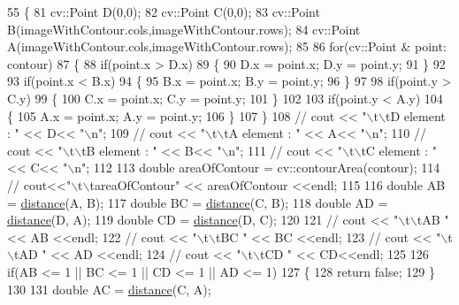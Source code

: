 \begin{DoxyCode}
55 \{
81     cv::Point D(0,0);
82     cv::Point C(0,0);
83     cv::Point B(imageWithContour.cols,imageWithContour.rows);
84     cv::Point A(imageWithContour.cols,imageWithContour.rows);
85 
86     \textcolor{keywordflow}{for}(cv::Point & point: contour)
87     \{
88         \textcolor{keywordflow}{if}(point.x > D.x)
89         \{
90             D.x = point.x; D.y = point.y;
91         \}
92 
93         \textcolor{keywordflow}{if}(point.x < B.x)
94         \{
95             B.x = point.x; B.y = point.y;
96         \}
97 
98         \textcolor{keywordflow}{if}(point.y > C.y)
99         \{
100             C.x = point.x; C.y = point.y;
101         \}
102 
103         \textcolor{keywordflow}{if}(point.y < A.y)
104         \{
105             A.x = point.x; A.y = point.y;
106         \}
107     \}
108 \textcolor{comment}{//    cout << "\(\backslash\)t\(\backslash\)tD element : " << D<< "\(\backslash\)n";}
109 \textcolor{comment}{//    cout << "\(\backslash\)t\(\backslash\)tA element : " << A<< "\(\backslash\)n";}
110 \textcolor{comment}{//    cout << "\(\backslash\)t\(\backslash\)tB element : " << B<< "\(\backslash\)n";}
111 \textcolor{comment}{//    cout << "\(\backslash\)t\(\backslash\)tC element : " << C<< "\(\backslash\)n";}
112 
113     \textcolor{keywordtype}{double} areaOfContour = cv::contourArea(contour);
114 \textcolor{comment}{//    cout<<"\(\backslash\)t\(\backslash\)tareaOfContour" << areaOfContour <<endl;}
115 
116     \textcolor{keywordtype}{double} AB = \hyperlink{class_contour_analis_a4f99f88069c6a746805275d21acdf5b2}{distance}(A, B);
117     \textcolor{keywordtype}{double} BC = \hyperlink{class_contour_analis_a4f99f88069c6a746805275d21acdf5b2}{distance}(C, B);
118     \textcolor{keywordtype}{double} AD = \hyperlink{class_contour_analis_a4f99f88069c6a746805275d21acdf5b2}{distance}(D, A);
119     \textcolor{keywordtype}{double} CD = \hyperlink{class_contour_analis_a4f99f88069c6a746805275d21acdf5b2}{distance}(D, C);
120 
121 \textcolor{comment}{//    cout << "\(\backslash\)t\(\backslash\)tAB " << AB <<endl;}
122 \textcolor{comment}{//    cout << "\(\backslash\)t\(\backslash\)tBC " << BC <<endl;}
123 \textcolor{comment}{//    cout << "\(\backslash\)t\(\backslash\)tAD " << AD <<endl;}
124 \textcolor{comment}{//    cout << "\(\backslash\)t\(\backslash\)tCD " << CD<<endl;}
125 
126     \textcolor{keywordflow}{if}(AB <= 1 || BC <= 1 || CD <= 1 || AD <= 1)
127     \{
128         \textcolor{keywordflow}{return} \textcolor{keyword}{false};
129     \}
130 
131     \textcolor{keywordtype}{double} AC = \hyperlink{class_contour_analis_a4f99f88069c6a746805275d21acdf5b2}{distance}(C, A);

\end{DoxyCode}
